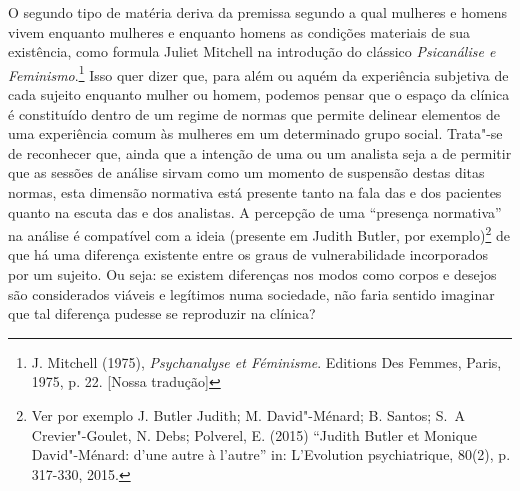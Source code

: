 O segundo tipo de matéria deriva da premissa segundo a qual mulheres e
homens vivem enquanto mulheres e enquanto homens as condições materiais
de sua existência, como formula Juliet Mitchell na introdução do
clássico \emph{Psicanálise e Feminismo}.\footnote{J. Mitchell (1975),
  \emph{Psychanalyse et Féminisme}. Editions Des Femmes, Paris, 1975, p.
  22. {[}Nossa tradução{]}} Isso quer dizer que, para além ou aquém da
experiência subjetiva de cada sujeito enquanto mulher ou homem, podemos
pensar que o espaço da clínica é constituído dentro de um regime de
normas que permite delinear elementos de uma experiência comum às
mulheres em um determinado grupo social. Trata"-se de reconhecer que,
ainda que a intenção de uma ou um analista seja a de permitir que as
sessões de análise sirvam como um momento de suspensão destas ditas
normas, esta dimensão normativa está presente tanto na fala das e dos
pacientes quanto na escuta das e dos analistas. A percepção de uma
``presença normativa'' na análise é compatível com a ideia (presente em
Judith Butler, por exemplo)\footnote{Ver por exemplo J. Butler Judith; M.
  David"-Ménard; B. Santos; S.~A Crevier"-Goulet, N. Debs; Polverel, E.
  (2015) ``Judith Butler et Monique David"-Ménard: d'une autre à
  l'autre'' in: L'Evolution psychiatrique, 80(2), p. 317-330, 2015.} de
que há uma diferença existente entre os graus de vulnerabilidade
incorporados por um sujeito. Ou seja: se existem diferenças nos modos
como corpos e desejos são considerados viáveis e legítimos numa
sociedade, não faria sentido imaginar que tal diferença pudesse se
reproduzir na clínica?

